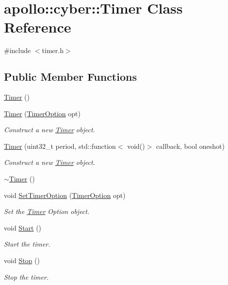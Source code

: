 \hypertarget{classapollo_1_1cyber_1_1Timer}{\section{apollo\-:\-:cyber\-:\-:Timer Class Reference}
\label{classapollo_1_1cyber_1_1Timer}
}


{\ttfamily \#include $<$timer.\-h$>$}

\subsection*{Public Member Functions}
\begin{DoxyCompactItemize}
\item 
\hyperlink{classapollo_1_1cyber_1_1Timer_a433f8bd6376d0a3d8cac529998052f6e}{Timer} ()
\item 
\hyperlink{classapollo_1_1cyber_1_1Timer_afdd6c9fe9bb5b5d48d4061e82197daae}{Timer} (\hyperlink{structapollo_1_1cyber_1_1TimerOption}{Timer\-Option} opt)
\begin{DoxyCompactList}\small\item\em Construct a new \hyperlink{classapollo_1_1cyber_1_1Timer}{Timer} object. \end{DoxyCompactList}\item 
\hyperlink{classapollo_1_1cyber_1_1Timer_a1c3d651afac72fe0370485dcb07c13e6}{Timer} (uint32\-\_\-t period, std\-::function$<$ void()$>$ callback, bool oneshot)
\begin{DoxyCompactList}\small\item\em Construct a new \hyperlink{classapollo_1_1cyber_1_1Timer}{Timer} object. \end{DoxyCompactList}\item 
\hyperlink{classapollo_1_1cyber_1_1Timer_a31c3aa1ad7acc8a20afb1ef6839b1b0c}{$\sim$\-Timer} ()
\item 
void \hyperlink{classapollo_1_1cyber_1_1Timer_aa56aad6720943db62e3d59475d400b24}{Set\-Timer\-Option} (\hyperlink{structapollo_1_1cyber_1_1TimerOption}{Timer\-Option} opt)
\begin{DoxyCompactList}\small\item\em Set the \hyperlink{classapollo_1_1cyber_1_1Timer}{Timer} Option object. \end{DoxyCompactList}\item 
void \hyperlink{classapollo_1_1cyber_1_1Timer_acfee595a5b142ce443e1b37427e2efc5}{Start} ()
\begin{DoxyCompactList}\small\item\em Start the timer. \end{DoxyCompactList}\item 
void \hyperlink{classapollo_1_1cyber_1_1Timer_a350a69e04b943f960ca992de21b676cf}{Stop} ()
\begin{DoxyCompactList}\small\item\em Stop the timer. \end{DoxyCompactList}\end{DoxyCompactItemize}
